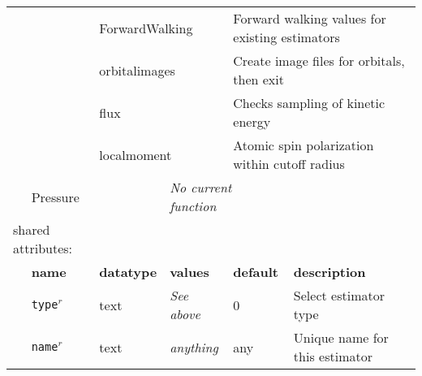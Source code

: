 \begin{table}[h]
\begin{center}
\begin{tabularx}{\textwidth}{l l l l l X }
\multicolumn{2}{l}{                } & \multicolumn{2}{l}{ForwardWalking    } & \multicolumn{2}{l}{Forward walking values for existing estimators}\\
\multicolumn{2}{l}{                } & \multicolumn{2}{l}{orbitalimages     } & \multicolumn{2}{l}{Create image files for orbitals, then exit}\\
\multicolumn{2}{l}{                } & \multicolumn{2}{l}{flux              } & \multicolumn{2}{l}{Checks sampling of kinetic energy}\\
\multicolumn{2}{l}{                } & \multicolumn{2}{l}{localmoment       } & \multicolumn{2}{l}{Atomic spin polarization within cutoff radius}\\
\dev{
\multicolumn{2}{l}{                } & \multicolumn{2}{l}{Pressure          } & \multicolumn{2}{l}{\textit{No current function}}\\
\multicolumn{2}{l}{shared attributes:} & \multicolumn{4}{l}{}\\
}
   &   \bfseries name     & \bfseries datatype & \bfseries values & \bfseries default   & \bfseries description \\
   &   \texttt{type}$^r$      &  text              & \textit{See above}        & 0                   & Select estimator type         \\
   &   \texttt{name}$^r$      &  text              & \textit{anything}         & any                 & Unique name for this estimator\\
\hline
\end{tabularx}
\end{center}
\end{table}
\FloatBarrier




